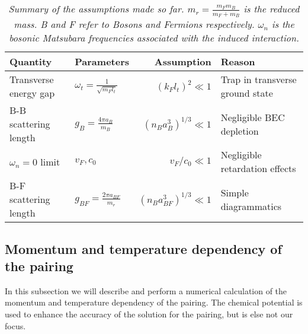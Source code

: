 \begin{table}[htb]
\centering
\caption{\textit{Summary of the assumptions made so far. $m_r = \frac{m_Fm_B}{m_F+m_B}$ is the reduced mass. B and F refer to Bosons and Fermions respectively. $\omega_n$ is the bosonic Matsubara frequencies associated with the induced interaction.}}
\begin{tabular}{|l|l|r|l|}
\hline \textbf{Quantity} & \textbf{Parameters} 						& \textbf{Assumption}						& \textbf{Reason}	\\
\hline Transverse energy gap & $\omega_t = \frac{1}{\sqrt{m_Fl_t}}$ & $(k_Fl_t)^2 	 	\ll 1$ 					& Trap in transverse ground state \\
\hline B-B scattering length & $g_B = \frac{4\pi a_B}{m_B}$			& $(n_Ba_B^3)^{1/3}	\ll 1$					& Negligible BEC depletion  \\
\hline $\omega_n = 0$ limit  & $v_F,c_0$							& $v_F/c_0 \ll 1$ & Negligible retardation effects  \\
\hline B-F scattering length & $g_{BF} = \frac{2\pi a_{BF}}{m_r}$ 	& $(n_Ba_{BF}^3)^{1/3}	\ll 1$				& Simple diagrammatics\\
\hline 
\end{tabular}
\label{tab.assumptions}
\end{table}

\subsection{Momentum and temperature dependency of the pairing}
\label{subsec.momentum_and_temperature_pairing_singlewire}
In this subsection we will describe and perform a numerical calculation of the momentum and temperature dependency of the pairing. The chemical potential is used to enhance the accuracy of the solution for the pairing, but is else not our focus. 

